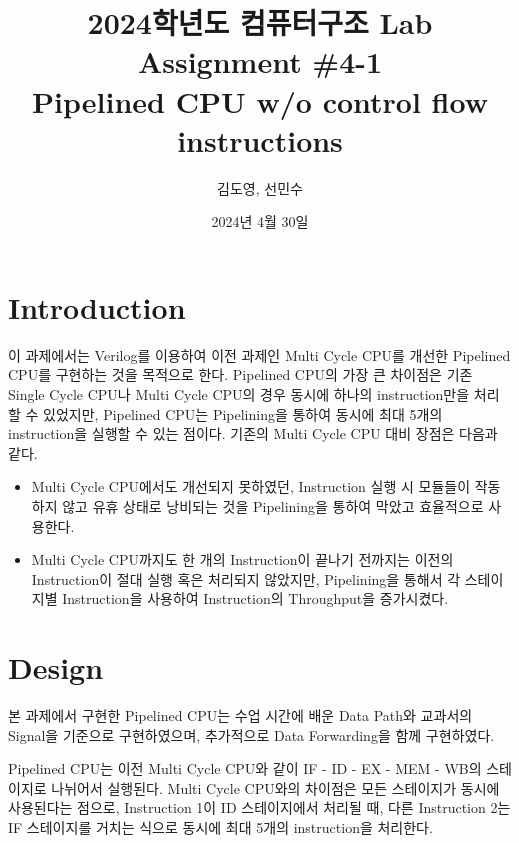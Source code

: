 \documentclass[openright, a4paper]{article}
\title{2024학년도 컴퓨터구조 Lab Assignment \#4-1\\
        Pipelined CPU w/o control flow instructions}
\author{김도영, 선민수}
\date{2024년 4월 30일}
\begin{document}
\maketitle


\section{Introduction}
이 과제에서는 Verilog를 이용하여 이전 과제인 Multi Cycle CPU를 개선한 Pipelined CPU를 구현하는 것을 목적으로 한다. Pipelined CPU의 가장 큰 차이점은 기존 Single Cycle CPU나 Multi Cycle CPU의 경우 동시에 하나의 instruction만을 처리할 수 있었지만, Pipelined CPU는 Pipelining을 통하여 동시에 최대 5개의 instruction을 실행할 수 있는 점이다. 기존의 Multi Cycle CPU 대비 장점은 다음과 같다.

\begin{itemize}
    \item Multi Cycle CPU에서도 개선되지 못하였던, Instruction 실행 시 모듈들이 작동하지 않고 유휴 상태로 낭비되는 것을 Pipelining을 통하여 막았고 효율적으로 사용한다.
    \item Multi Cycle CPU까지도 한 개의 Instruction이 끝나기 전까지는 이전의 Instruction이 절대 실행 혹은 처리되지 않았지만, Pipelining을 통해서 각 스테이지별 Instruction을 사용하여 Instruction의 Throughput을 증가시켰다.
\end{itemize}


\section{Design}
본 과제에서 구현한 Pipelined CPU는 수업 시간에 배운 Data Path와 교과서의 Signal을 기준으로 구현하였으며, 추가적으로 Data Forwarding을 함께 구현하였다.

\hfill

Pipelined CPU는 이전 Multi Cycle CPU와 같이 IF - ID - EX - MEM - WB의 스테이지로 나뉘어서 실행된다. Multi Cycle CPU와의 차이점은 모든 스테이지가 동시에 사용된다는 점으로, Instruction 1이 ID 스테이지에서 처리될 때, 다른 Instruction 2는 IF 스테이지를 거치는 식으로 동시에 최대 5개의 instruction을 처리한다.
\end{document}
